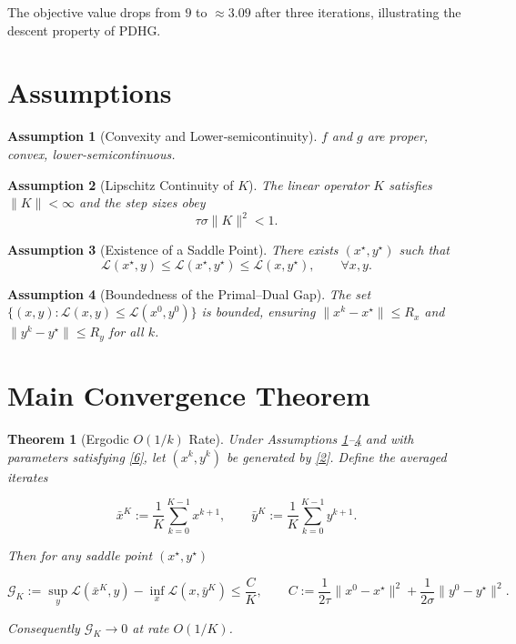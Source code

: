 \documentclass{article}
\newtheorem{theorem}{Theorem}
\newtheorem{assumption}{Assumption}
\begin{document}
The objective value drops from $9$ to $\approx3.09$ after three iterations, illustrating the descent property of PDHG.

\section*{Assumptions}
\begin{assumption}[Convexity and Lower‑semicontinuity]\label{ass:convex}
$f$ and $g$ are proper, convex, lower‑semicontinuous.
\end{assumption}
\begin{assumption}[Lipschitz Continuity of $K$]\label{ass:K}
The linear operator $K$ satisfies $\|K\|<\infty$ and the step sizes obey
\[
\tau\sigma\|K\|^{2}<1.
\tag{6}
\]
\end{assumption}
\begin{assumption}[Existence of a Saddle Point]\label{ass:saddle}
There exists $(x^{\star},y^{\star})$ such that
\[
\mathcal{L}(x^{\star},y)\le \mathcal{L}(x^{\star},y^{\star})\le
\mathcal{L}(x,y^{\star}),\qquad\forall x,y.
\tag{7}
\]
\end{assumption}
\begin{assumption}[Boundedness of the Primal–Dual Gap]\label{ass:bounded}
The set $\{(x,y):\mathcal{L}(x,y)\le \mathcal{L}(x^{0},y^{0})\}$ is bounded, ensuring
$\|x^{k}-x^{\star}\|\le R_{x}$ and $\|y^{k}-y^{\star}\|\le R_{y}$ for all $k$.
\end{assumption}

\section*{Main Convergence Theorem}
\begin{theorem}[Ergodic $O(1/k)$ Rate]\label{thm:rate}
Under Assumptions \ref{ass:convex}–\ref{ass:bounded} and with parameters satisfying \eqref{6},
let $(x^{k},y^{k})$ be generated by \eqref{2}. Define the averaged iterates  

\[
\bar x^{K}:=\frac{1}{K}\sum_{k=0}^{K-1}x^{k+1},
\qquad
\bar y^{K}:=\frac{1}{K}\sum_{k=0}^{K-1}y^{k+1}.
\]

Then for any saddle point $(x^{\star},y^{\star})$

\[
\mathcal{G}_{K}:=
\sup_{y}\mathcal{L}(\bar x^{K},y)-\inf_{x}\mathcal{L}(x,\bar y^{K})
\le
\frac{C}{K},
\qquad
C:=\frac{1}{2\tau}\|x^{0}-x^{\star}\|^{2}
     +\frac{1}{2\sigma}\|y^{0}-y^{\star}\|^{2}.
\tag{8}
\]

Consequently $\mathcal{G}_{K}\to0$ at rate $O(1/K)$.
\end{theorem}
\end{document}
